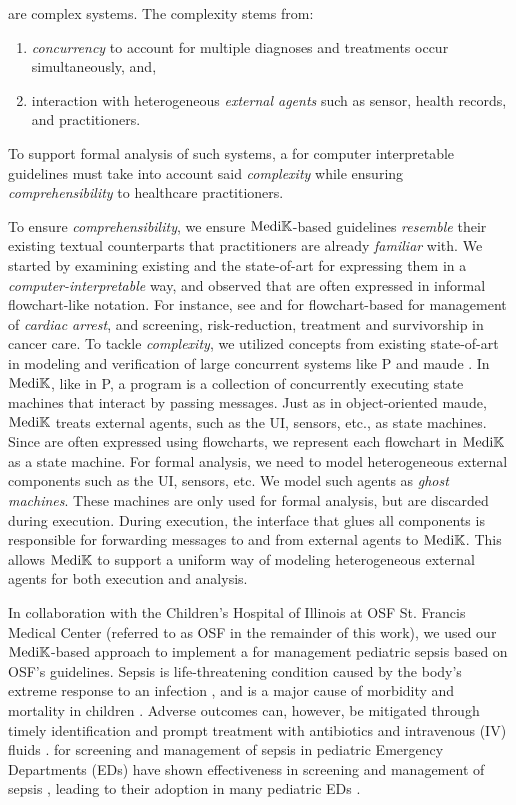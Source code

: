 \CDSSs{} are complex systems. The complexity stems from:
\begin{enumerate}[label=(\roman*)]
  \item \emph{concurrency} to account for multiple diagnoses and treatments
    occur simultaneously, and,
  \item interaction with heterogeneous \emph{external agents} such as sensor,
    health records, and practitioners.
\end{enumerate}
To support formal analysis of such systems, a \DSL{} for
computer interpretable guidelines must take into account said \emph{complexity}
while ensuring \emph{comprehensibility} to healthcare practitioners.

To ensure \emph{comprehensibility}, we ensure $\text{Medi}\mathbb{K}{}{}$-based guidelines \emph{resemble}
their existing textual counterparts that practitioners are already
\emph{familiar} with. We started by examining existing \BPGs{} and the
state-of-art \DSLs{} for expressing them in a \emph{computer-interpretable} way, and observed that
\BPGs{} are often expressed in informal flowchart-like notation. For instance,
see \cite{AHAFlowcharts} and \cite{CancerCareFlowcharts} for flowchart-based \BPGs{} for management of \emph{cardiac arrest}, and
screening, risk-reduction, treatment and survivorship in cancer care.
To tackle \emph{complexity},
we utilized concepts from existing state-of-art in modeling
and verification of large concurrent systems like P \cite{DesaiPLDI13} and maude
\cite{MaudeBook}.
In $\text{Medi}\mathbb{K}{}$, like in P, a program is a collection of concurrently executing state
machines that interact by passing messages. Just as in object-oriented maude,
$\text{Medi}\mathbb{K}{}{}$ treats external agents, such as the UI, sensors, etc., as state machines.
Since \BPGs{} are often expressed using flowcharts, we represent each flowchart
in $\text{Medi}\mathbb{K}{}{}$ as a state machine. For formal analysis, we need to model
heterogeneous external components such as the UI, sensors, etc.
We model such agents as \emph{ghost machines}.
These machines are only used for formal analysis, but are discarded during
execution. During execution, the interface that glues all components
is responsible for forwarding messages to and from external agents to $\text{Medi}\mathbb{K}{}$.
This allows $\text{Medi}\mathbb{K}{}$ to support a uniform way of
modeling heterogeneous external agents for both execution and analysis.

In collaboration with the Children's Hospital of Illinois at
OSF St. Francis Medical Center (referred to as OSF in the remainder of this
work), we used our $\text{Medi}\mathbb{K}{}$-based approach  to implement a \CDSS{} for management pediatric sepsis
based on OSF's guidelines.
Sepsis is life-threatening condition caused by the body's extreme response to
an infection \cite{RhodesICM17}, and is
a major cause of morbidity and mortality in children \cite{Eisenberg2021JP}.
Adverse outcomes can, however, be mitigated through timely
identification and prompt treatment with antibiotics and
intravenous (IV) fluids \cite{Weiss2014CCM,Evans2018JAMA}.
\BPGs{} for screening and management of sepsis in pediatric Emergency
Departments (EDs) have shown effectiveness in screening and management of sepsis \cite{Eisenberg2021JP},
leading to their adoption in many pediatric EDs \cite{Balamuth2017EM,Sepanski2014FP}.

